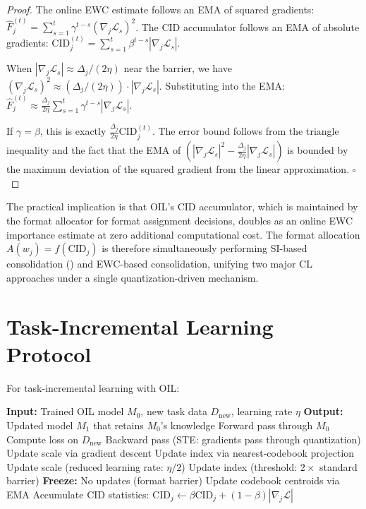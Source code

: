\begin{proof}
The online EWC estimate follows an EMA of squared gradients: $\hat{F}_j^{(t)} = \sum_{s=1}^t \gamma^{t-s} (\nabla_j \mathcal{L}_s)^2$. The CID accumulator follows an EMA of absolute gradients: $\text{CID}_j^{(t)} = \sum_{s=1}^t \beta^{t-s} |\nabla_j \mathcal{L}_s|$.

When $|\nabla_j \mathcal{L}_s| \approx \Delta_j / (2\eta)$ near the barrier, we have $(\nabla_j \mathcal{L}_s)^2 \approx (\Delta_j / (2\eta)) \cdot |\nabla_j \mathcal{L}_s|$. Substituting into the EMA: $\hat{F}_j^{(t)} \approx \frac{\Delta_j}{2\eta} \sum_{s=1}^t \gamma^{t-s} |\nabla_j \mathcal{L}_s|$.

If $\gamma = \beta$, this is exactly $\frac{\Delta_j}{2\eta} \text{CID}_j^{(t)}$. The error bound follows from the triangle inequality and the fact that the EMA of $(|\nabla_j \mathcal{L}_s|^2 - \frac{\Delta_j}{2\eta} |\nabla_j \mathcal{L}_s|)$ is bounded by the maximum deviation of the squared gradient from the linear approximation. $\square$
\end{proof}

The practical implication is that OIL's CID accumulator, which is maintained by the format allocator for format assignment decisions, doubles as an online EWC importance estimate at zero additional computational cost. The format allocation $A(w_j) = f(\text{CID}_j)$ is therefore simultaneously performing SI-based consolidation () and EWC-based consolidation, unifying two major CL approaches under a single quantization-driven mechanism.

\section{Task-Incremental Learning Protocol}
\label{sec:task_incremental}

For task-incremental learning with OIL:

\begin{algorithm}[H]
\caption{OIL Continual Learning}
\label{alg:continual_learning}
\begin{algorithmic}[1]
\STATE \textbf{Input:} Trained OIL model $M_0$, new task data $D_{\text{new}}$, learning rate $\eta$
\STATE \textbf{Output:} Updated model $M_1$ that retains $M_0$'s knowledge
    \STATE Forward pass through $M_0$
    \STATE Compute loss on $D_{\text{new}}$
    \STATE Backward pass (STE: gradients pass through quantization)
            \STATE Update scale via gradient descent
            \STATE Update index via nearest-codebook projection
            \STATE Update scale (reduced learning rate: $\eta/2$)
            \STATE Update index (threshold: $2\times$ standard barrier)
            \STATE \textbf{Freeze:} No updates (format barrier)
        \ENDIF
    \ENDFOR
    \STATE Update codebook centroids via EMA
    \STATE Accumulate CID statistics: $\text{CID}_j \gets \beta \text{CID}_j + (1-\beta) |\nabla_j \mathcal{L}|$
\ENDFOR
\end{algorithmic}
\end{algorithm}

